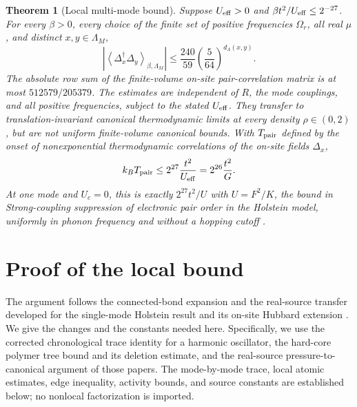\documentclass[11pt]{article}
\newtheorem{theorem}{Theorem}
\newcommand{\Deltaop}{\Delta}
\begin{document}
\begin{theorem}[Local multi-mode bound]\label{thm:local}
Suppose $U_{\rm eff}>0$ and $\beta t^2/U_{\rm eff}\le2^{-27}$. For every $\beta>0$, every choice of the finite set of positive frequencies $\Omega_r$, all real $\mu$, and distinct $x,y\in\Lambda_M$,
\[
\left|\left\langle\Deltaop_x^\dagger\Deltaop_y\right\rangle_{\beta,\Lambda_M}\right|
\le \frac{240}{59}\left(\frac5{64}\right)^{d_\Lambda(x,y)}.
\]
The absolute row sum of the finite-volume on-site pair-correlation matrix is at most $512579/205379$. The estimates are independent of $R$, the mode couplings, and all positive frequencies, subject to the stated $U_{\rm eff}$. They transfer to translation-invariant canonical thermodynamic limits at every density $\rho\in(0,2)$, but are not uniform finite-volume canonical bounds. With $T_{\rm pair}$ defined by the onset of nonexponential thermodynamic correlations of the on-site fields $\Deltaop_x$,
\[
 k_BT_{\rm pair}\le 2^{27}\frac{t^2}{U_{\rm eff}}=2^{26}\frac{t^2}{G}.
\]
At one mode and $U_c=0$, this is exactly $2^{27}t^2/U$ with $U=F^2/K$, the bound in \emph{Strong-coupling suppression of electronic pair order in the Holstein model, uniformly in phonon frequency and without a hopping cutoff} \cite{strongcoupling}.
\end{theorem}

\section{Proof of the local bound}
The argument follows the connected-bond expansion and the real-source transfer developed for the single-mode Holstein result \cite{strongcoupling} and its on-site Hubbard extension \cite{hubbardholstein}. We give the changes and the constants needed here. Specifically, we use the corrected chronological trace identity for a harmonic oscillator, the hard-core polymer tree bound and its deletion estimate, and the real-source pressure-to-canonical argument of those papers. The mode-by-mode trace, local atomic estimates, edge inequality, activity bounds, and source constants are established below; no nonlocal factorization is imported.
\end{document}
